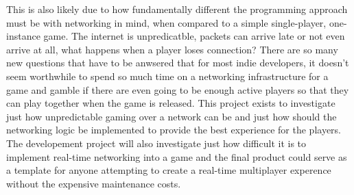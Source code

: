 This is also likely due to how fundamentally different the programming approach must be with networking in mind, when compared to a simple single-player, one-instance game. The internet is unpredicatble, packets can arrive late or not even arrive at all, what happens when a player loses connection? There are so many new questions that have to be anwsered that for most indie developers, it doesn't seem worthwhile to spend so much time on a networking infrastructure for a game and gamble if there are even going to be enough active players so that they can play together when the game is released. This project exists to investigate just how unpredictable gaming over a network can be and just how should the networking logic be implemented to provide the best experience for the players. The developement project will also investigate just how difficult it is to implement real-time networking into a game and the final product could serve as a template for anyone attempting to create a real-time multiplayer experence without the expensive maintenance costs.


\newpage
